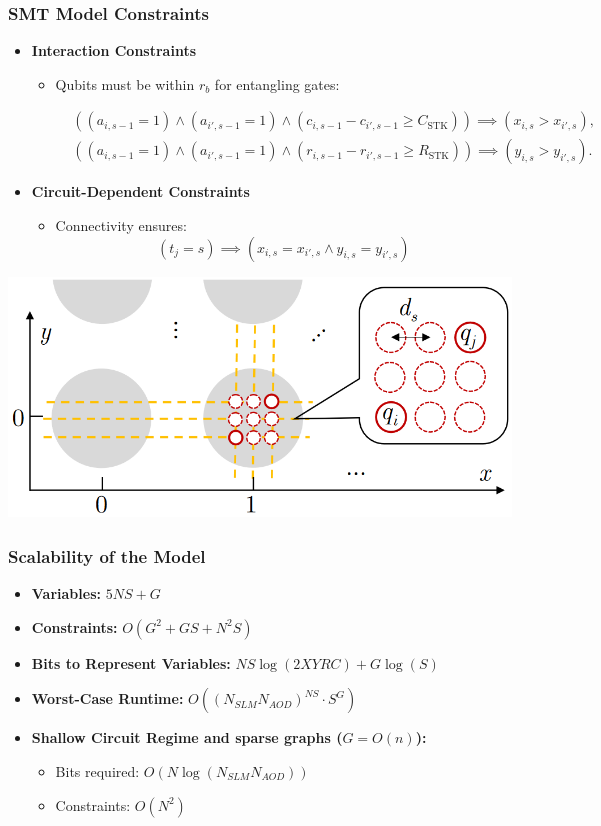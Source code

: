 \documentclass[18 pt]{beamer}
\begin{document}
\begin{frame}
    \frametitle{SMT Model Constraints}
    \begin{itemize}
        \item \textbf{Interaction Constraints}
        \begin{itemize}
            \item Qubits must be within \( r_b \) for entangling gates:
            \begin{small}
                \begin{align*}
                    &((a_{i,s-1} = 1) \land (a_{i',s-1} = 1) \land (c_{i,s-1} - c_{i',s-1} \geq C_{\text{STK}})) \implies (x_{i,s} > x_{i',s}), \\
                    &((a_{i,s-1} = 1) \land (a_{i',s-1} = 1) \land (r_{i,s-1} - r_{i',s-1} \geq R_{\text{STK}})) \implies (y_{i,s} > y_{i',s}).
                \end{align*}
            \end{small}
        \end{itemize}
        \item \textbf{Circuit-Dependent Constraints}
        \begin{itemize}
            \item Connectivity ensures:
            \[
                (t_j=s)\implies (x_{i,s}=x_{i',s}\land y_{i,s}=y_{i',s})
            \]
        \end{itemize}
    \end{itemize}
    \begin{center}
        \includegraphics[width=.6\textwidth]{stack.png}
    \end{center}
\end{frame}
\begin{frame}
    \frametitle{Scalability of the Model}
    \begin{itemize}
        \item \textbf{Variables:} \(5NS + G\)
        \item \textbf{Constraints:} \(O(G^2 + GS + N^2S)\)
        \item \textbf{Bits to Represent Variables:} \(NS \log(2XY RC) + G \log(S)\)
        \item \textbf{Worst-Case Runtime:} \(O((N_{SLM}N_{AOD})^{NS }\cdot S ^G)\)
        \item \textbf{Shallow Circuit Regime and sparse graphs (\(G=O(n)\)):}
        \begin{itemize}
            \item Bits required: \(O(N \log(N_{SLM}N_{AOD}))\)
            \item Constraints: \(O(N^2)\)
        \end{itemize}
    \end{itemize}
\end{frame}
\end{document}
